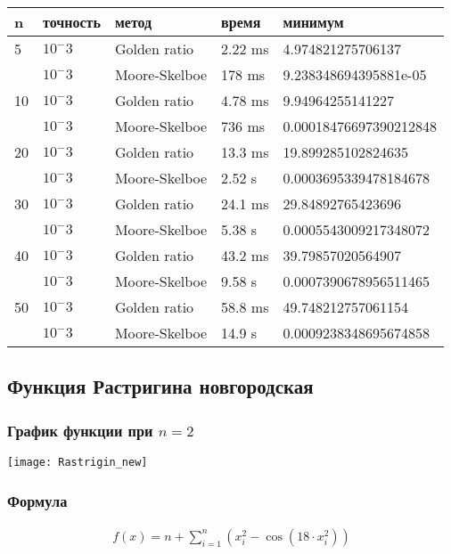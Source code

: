 \documentclass{article}
\begin{document}
    \begin{tabular}{ |p{2cm}|p{2cm}|p{3cm}|p{2cm}|p{4cm}|  }
        \hline
        n  & точность & метод         & время   & минимум                \\
        \hline
        5  & $10^-3$  & Golden ratio  & 2.22 ms & 4.974821275706137      \\\cline{2-5}
        & $10^-3$  & Moore-Skelboe & 178 ms  & 9.238348694395881e-05  \\
        \hline
        10 & $10^-3$  & Golden ratio  & 4.78 ms & 9.94964255141227       \\\cline{2-5}
        & $10^-3$  & Moore-Skelboe & 736 ms  & 0.00018476697390212848 \\
        \hline
        20 & $10^-3$  & Golden ratio  & 13.3 ms & 19.899285102824635     \\\cline{2-5}
        & $10^-3$  & Moore-Skelboe & 2.52 s  & 0.0003695339478184678  \\
        \hline
        30 & $10^-3$  & Golden ratio  & 24.1 ms & 29.84892765423696      \\\cline{2-5}
        & $10^-3$  & Moore-Skelboe & 5.38 s  & 0.0005543009217348072  \\
        \hline
        40 & $10^-3$  & Golden ratio  & 43.2 ms & 39.79857020564907      \\\cline{2-5}
        & $10^-3$  & Moore-Skelboe & 9.58 s  & 0.0007390678956511465  \\
        \hline
        50 & $10^-3$  & Golden ratio  & 58.8 ms & 49.748212757061154     \\\cline{2-5}
        & $10^-3$  & Moore-Skelboe & 14.9 s  & 0.0009238348695674858  \\
        \hline

    \end{tabular}

    \subsection{Функция Растригина новгородская}

    \subsubsection{График функции при $n=2$}
    \texttt{[image: Rastrigin\_new]}

    \subsubsection{Формула}
    \begin{gather*}
        f(x)=n+\sum_{i=1}^n\left(x_i^2-\cos \left(18 \cdot x_i^2\right)\right)
    \end{gather*}
\end{document}
